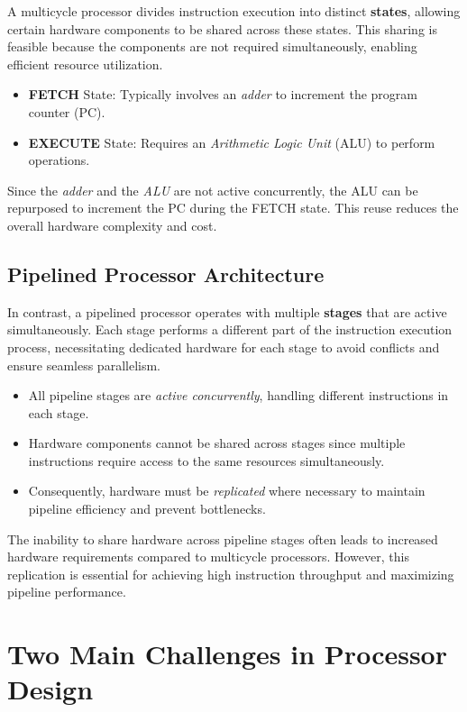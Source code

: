 A multicycle processor divides instruction execution into distinct \textbf{states}, allowing certain hardware components to be shared across these states. This sharing is feasible because the components are not required simultaneously, enabling efficient resource utilization.

\begin{itemize}
    \item \textbf{FETCH} State: Typically involves an \textit{adder} to increment the program counter (PC).
    \item \textbf{EXECUTE} State: Requires an \textit{Arithmetic Logic Unit} (ALU) to perform operations.
\end{itemize}

Since the \textit{adder} and the \textit{ALU} are not active concurrently, the ALU can be repurposed to increment the PC during the FETCH state. This reuse reduces the overall hardware complexity and cost.

\subsection{Pipelined Processor Architecture}

In contrast, a pipelined processor operates with multiple \textbf{stages} that are active simultaneously. Each stage performs a different part of the instruction execution process, necessitating dedicated hardware for each stage to avoid conflicts and ensure seamless parallelism.

\begin{itemize}
    \item All pipeline stages are \textit{active concurrently}, handling different instructions in each stage.
    \item Hardware components cannot be shared across stages since multiple instructions require access to the same resources simultaneously.
    \item Consequently, hardware must be \textit{replicated} where necessary to maintain pipeline efficiency and prevent bottlenecks.
\end{itemize}

The inability to share hardware across pipeline stages often leads to increased hardware requirements compared to multicycle processors. However, this replication is essential for achieving high instruction throughput and maximizing pipeline performance.
\newpage
\section{Two Main Challenges in Processor Design}

